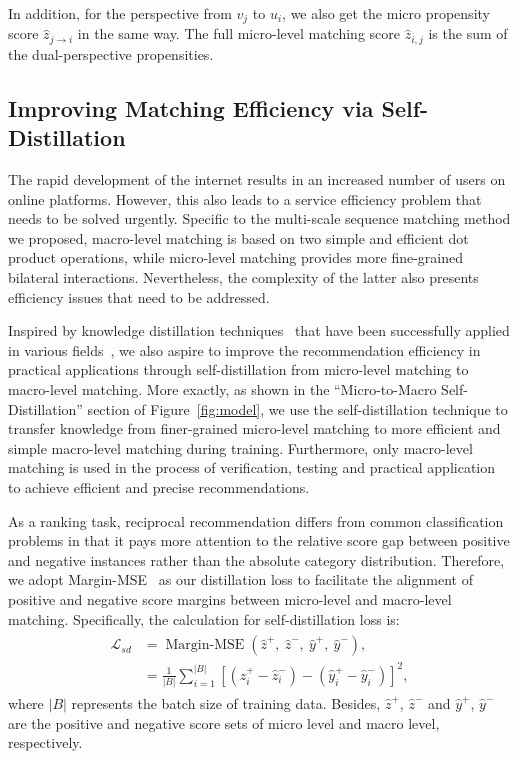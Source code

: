 In addition, for the perspective from $v_j$ to $u_i$, we also get the micro propensity score ${\hat{z}}_{j \rightarrow i}$ in the same way. The full micro-level matching score ${\hat{z}}_{i,j}$ is the sum of the dual-perspective propensities.

\subsection{Improving Matching Efficiency via Self-Distillation}
The rapid development of the internet results in an increased number of users on online platforms. However, this also leads to a service efficiency problem that needs to be solved urgently. 
Specific to the multi-scale sequence matching method we proposed, macro-level matching is based on two simple and efficient dot product operations, while micro-level matching provides more fine-grained bilateral interactions. 
Nevertheless, the complexity of the latter also presents efficiency issues that need to be addressed.

Inspired by knowledge distillation techniques~\cite{hinton2015distilling} that have been successfully applied in various fields~\cite{zhang2019your,sanh2019distilbert,hofstatter2020improving,tian2023directed}, we also aspire to improve the recommendation efficiency in practical applications through self-distillation from micro-level matching to macro-level matching.
More exactly, as shown in the ``Micro-to-Macro Self-Distillation'' section of Figure~\ref{fig:model}, we use the self-distillation technique to transfer knowledge from finer-grained micro-level matching to more efficient and simple macro-level matching during training. 
Furthermore, only macro-level matching is used in the process of verification, testing and practical application to achieve efficient and precise recommendations.

As a ranking task, reciprocal recommendation differs from common classification problems in that it pays more attention to the relative score gap between positive and negative instances rather than the absolute category distribution. Therefore, we adopt Margin-MSE~\cite{hofstatter2020improving} as our distillation loss to facilitate the alignment of positive and negative score margins between micro-level and macro-level matching. Specifically, the calculation for self-distillation loss is:
\begin{align}
\begin{split}
\mathcal{L}_{sd}
    & = \operatorname{Margin-MSE} \left({\hat{z}}^{+}, \ {\hat{z}}^{-}, \ {\hat{y}}^{+}, \ {\hat{y}}^{-}\right), \\
    & = \frac{1}{|B|} \sum^{|B|}_{i=1} \left[(\hat{z}^{+}_{i} - \hat{z}^{-}_{i}) - (\hat{y}^{+}_i -\hat{y}^{-}_i )\right]^{2},
\end{split}
\end{align}
where $|B|$ represents the batch size of training data. Besides, ${\hat{z}}^{+}$, ${\hat{z}}^{-}$ and ${\hat{y}}^{+}$, ${\hat{y}}^{-}$ are the positive and negative score sets of micro level and macro level, respectively. 

